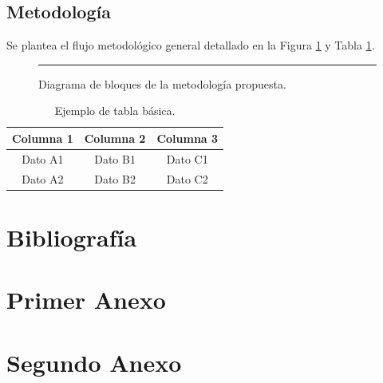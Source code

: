 \documentclass[12pt,a4paper]{report}
\begin{document}
\section{Metodología}
Se plantea el flujo metodológico general detallado en la Figura \ref{fig:metodologia} y Tabla \ref{tab:tabla_random}.

\begin{figure}[htbp]
    \centering
    \rule{6cm}{4cm} %
    \caption{Diagrama de bloques de la metodología propuesta.}
    \label{fig:metodologia}
\end{figure}

\begin{table}[h!]
\centering
\caption{Ejemplo de tabla básica.}
\label{tab:tabla_random}
\begin{tabular}{|c|c|c|}
\hline
Columna 1 & Columna 2 & Columna 3 \\ \hline
Dato A1 & Dato B1 & Dato C1 \\ \hline
Dato A2 & Dato B2 & Dato C2 \\ \hline
\end{tabular}
\end{table}

\chapter{Bibliografía}
\printbibliography[heading=none]

\newpage
\appendix
\clearpage

\chapter{Primer Anexo}
\label{anexoA}

\chapter{Segundo Anexo}
\label{anexoB}
\end{document}
